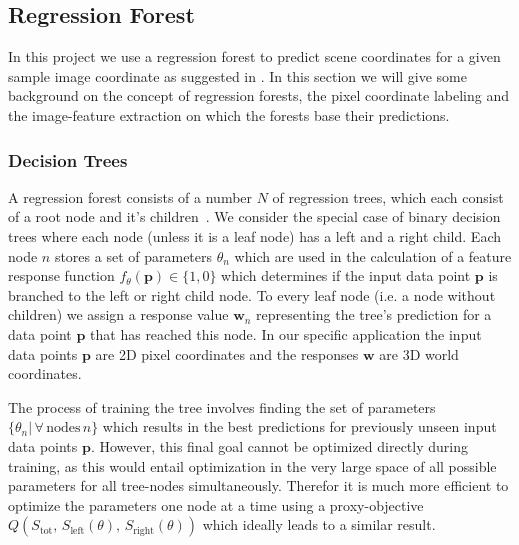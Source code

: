 \documentclass[final]{cvpr}
\begin{document}
\subsection{Regression Forest}

In this project we use a regression forest to predict scene coordinates for a given
sample image coordinate as suggested in \cite{shotton2013}. In this section we will
give some background on the concept of regression forests, the pixel coordinate
labeling and the image-feature extraction on which the forests base their predictions.\\

\subsubsection{Decision Trees}
A regression forest consists of a number $N$ of regression trees, which each consist 
of a root node and it's children~\cite{Criminisi2013}. We consider the special case of binary decision trees
where each node (unless it is a leaf node) has a left and a right child. Each node $n$
stores a set of parameters $\theta_n$ which are used in the calculation of a
feature response function $f_{\theta}(\boldsymbol{p}) \in \{1, 0\}$ which determines if the input
data point $\boldsymbol{p}$ is branched to the left or right child node. To every leaf node
(i.e. a node without children) we assign a response value $\boldsymbol{w}_n$ representing
the tree's prediction for a data point $\boldsymbol{p}$ that has reached this node. In our
specific application the input data points $\boldsymbol{p}$ are 2D pixel coordinates and the
responses $\boldsymbol{w}$ are 3D world coordinates.

The process of training the tree involves finding the set of parameters
$\{\theta_n | \, \forall \, \text{nodes} \, n\}$ which results in the best predictions
for previously unseen input data points $\boldsymbol{p}$. However, this final goal cannot
be optimized directly during training, as this would entail optimization in the
very large space of all possible parameters for all tree-nodes simultaneously. Therefor
it is much more efficient to optimize the parameters one node at a time using a
proxy-objective $Q(S_{\text{tot}},\, S_{\text{left}}(\theta),\, S_{\text{right}}(\theta))$
which ideally leads to a similar result.
\end{document}
